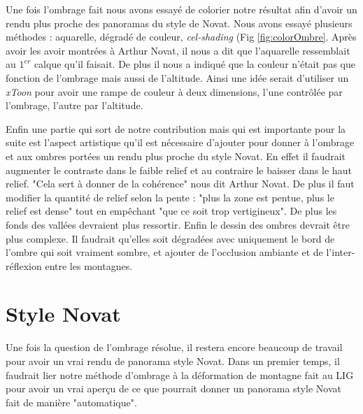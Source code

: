 Une fois l'ombrage fait nous avons essayé de colorier notre résultat afin d'avoir un rendu plus proche des panoramas du style de Novat. Nous avons essayé plusieurs méthodes : aquarelle, dégradé de couleur, \textit{cel-shading} (Fig \ref{fig:colorOmbre}. Après avoir les avoir montrées à Arthur Novat, il nous a dit que l’aquarelle ressemblait au $1^{er}$ calque qu'il faisait.  De plus il nous a indiqué que la couleur n'était pas que fonction de l'ombrage mais aussi de l'altitude. Ainsi une idée serait d'utiliser un \textit{xToon} \cite{barla2006x} pour avoir une rampe de couleur à deux dimensions, l'une contrôlée par l'ombrage, l'autre par l'altitude. 

Enfin une partie qui sort de notre contribution mais qui est importante pour la suite est l'aspect artistique qu'il est nécessaire d'ajouter pour donner à l'ombrage et aux ombres portées un rendu plus proche du style Novat. En effet  il faudrait augmenter le contraste dans le faible relief et au contraire le baisser dans le haut relief. "Cela sert à donner de la cohérence" nous dit Arthur Novat. De plus il faut modifier la quantité de relief selon la pente : "plus la zone est pentue, plus le relief est dense" tout en empêchant "que ce soit trop vertigineux". De plus les fonds des vallées devraient plus ressortir. Enfin le dessin des ombres devrait être plus complexe. Il faudrait qu'elles soit dégradées avec uniquement le bord de l'ombre qui soit vraiment sombre, et ajouter de l'occlusion ambiante et de l'inter-réflexion entre les montagnes.

\section{Style Novat}
	Une fois la question de l'ombrage résolue, il restera encore beaucoup de travail pour avoir un vrai rendu de panorama style Novat. Dans un premier temps, il faudrait lier notre méthode d'ombrage à la déformation de montagne fait au LIG pour avoir un vrai aperçu de ce que pourrait donner un panorama style Novat fait de manière "automatique".

